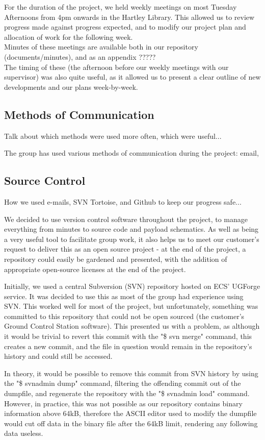 For the duration of the project, we held weekly meetings on most Tuesday 
Afternoons from 4pm onwards in the Hartley Library. This allowed us to 
review progress made against progress expected, and to modify our project 
plan and allocation of work for the following week.
\\
Minutes of these meetings are available both in our repository \cite{github} 
(documents/minutes), and as an appendix ?????
\\
The timing of these (the afternoon before our weekly meetings with our 
supervisor) was also quite useful, as it allowed us to present a clear outline 
of new developments and our plans week-by-week.

\subsection{Methods of Communication}
Talk about which methods were used more often, which were useful...

The group has used various methods of communication during the project: 
email, 

\subsection{Source Control}
How we used e-mails, SVN Tortoise, and Github to keep our progress safe...

We decided to use version control software throughout the project, to manage 
everything from minutes to source code and payload schematics. As well as 
being a very useful tool to facilitate group work, it also helps us to meet 
our customer's request to deliver this as an open source project - at the end 
of the project, a repository could easily be gardened and presented, with the 
addition of appropriate open-source licenses at the end of the project.

Initially, we used a central Subversion (SVN) repository hosted on ECS' 
UGForge service. It was decided to use this as most of the group had 
experience using SVN. This worked well for most of the project, but 
unfortunately, something was committed to this repository that could not be 
open sourced (the customer's Ground Control Station software). This presented 
us with a problem, as although it would be trivial to revert this commit with 
the "\$ svn merge" command, this creates a new commit, and the file in 
question would remain in the repository's history and could still be accessed.

In theory, it would be possible to remove this commit from SVN history by 
using the "\$ svnadmin dump" command, filtering the offending commit out of 
the dumpfile, and regenerate the repository with the "\$ svnadmin load" 
command. However, in practice, this was not possible as our repository 
contains binary information above 64kB, therefore the ASCII editor used to 
modify the dumpfile would cut off data in the binary file after the 64kB 
limit, rendering any following data useless.

